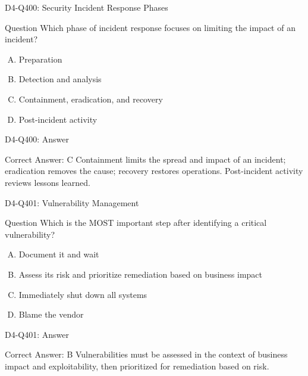 \documentclass{beamer}
\begin{document}
\begin{frame}{D4-Q400: Security Incident Response Phases}
	\begin{block}{Question}
		Which phase of incident response focuses on limiting the impact of an incident?
	\end{block}
	\begin{enumerate}[(A)]
		\item Preparation
		\item Detection and analysis
		\item Containment, eradication, and recovery
		\item Post-incident activity
	\end{enumerate}
\end{frame}
\begin{frame}{D4-Q400: Answer}
	\begin{block}{Correct Answer: C}
		Containment limits the spread and impact of an incident; eradication removes the cause; recovery restores operations. Post-incident activity reviews lessons learned.
	\end{block}
\end{frame}

\begin{frame}{D4-Q401: Vulnerability Management}
	\begin{block}{Question}
		Which is the MOST important step after identifying a critical vulnerability?
	\end{block}
	\begin{enumerate}[(A)]
		\item Document it and wait
		\item Assess its risk and prioritize remediation based on business impact
		\item Immediately shut down all systems
		\item Blame the vendor
	\end{enumerate}
\end{frame}
\begin{frame}{D4-Q401: Answer}
	\begin{block}{Correct Answer: B}
		Vulnerabilities must be assessed in the context of business impact and exploitability, then prioritized for remediation based on risk.
	\end{block}
\end{frame}
\end{document}
